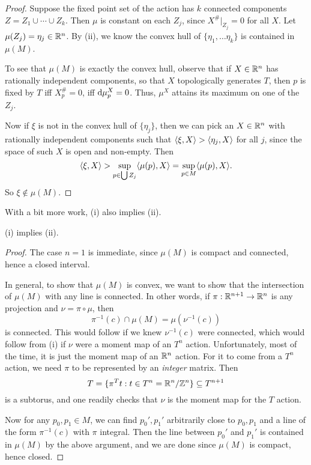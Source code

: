 \documentclass[a4paper]{article}
\begin{document}
\begin{proof}
  Suppose the fixed point set of the action has $k$ connected components $Z = Z_1 \cup \cdots \cup Z_k$. Then $\mu$ is constant on each $Z_j$, since $X^\#|_{Z_j} = 0$ for all $X$. Let $\mu(Z_j) = \eta_j \in \mathbb{R}^n$. By (ii), we know the convex hull of $\{\eta_1, \ldots \eta_k\}$ is contained in $\mu(M)$.

  To see that $\mu(M)$ is exactly the convex hull, observe that if $X \in \mathbb{R}^n$ has rationally independent components, so that $X$ topologically generates $T$, then $p$ is fixed by $T$ iff $X_p^\# = 0$, iff $\mathrm{d} \mu_p^X = 0$. Thus, $\mu^X$ attains its maximum on one of the $Z_j$.

  Now if $\xi$ is not in the convex hull of $\{\eta_j\}$, then we can pick an $X \in \mathbb{R}^n$ with rationally independent components such that $\langle \xi, X\rangle > \langle \eta_j, X\rangle$ for all $j$, since the space of such $X$ is open and non-empty. Then
  \[
    \langle \xi, X\rangle > \sup_{p \in \bigcup Z_j} \langle \mu(p), X\rangle = \sup_{p \in M} \langle \mu(p), X\rangle.
  \]
  So $\xi \not \in \mu(M)$.
\end{proof}

With a bit more work, (i) also implies (ii).
\begin{lemma}
  (i) implies (ii).
\end{lemma}
\begin{proof}
  The case $n = 1$ is immediate, since $\mu(M)$ is compact and connected, hence a closed interval.

  In general, to show that $\mu(M)$ is convex, we want to show that the intersection of $\mu(M)$ with any line is connected. In other words, if $\pi: \mathbb{R}^{n + 1} \to \mathbb{R}^n$ is any projection and $\nu = \pi \circ \mu$, then
  \[
    \pi^{-1}(c) \cap \mu(M) = \mu(\nu^{-1}(c))
  \]
  is connected. This would follow if we knew $\nu^{-1}(c)$ were connected, which would follow from (i) if $\nu$ were a moment map of an $T^n$ action. Unfortunately, most of the time, it is just the moment map of an $\mathbb{R}^n$ action. For it to come from a $T^n$ action, we need $\pi$ to be represented by an \emph{integer} matrix. Then
  \[
    T = \{\pi^T t : t \in T^n = \mathbb{R}^n /\mathbb{Z}^n\} \subseteq T^{n + 1}
  \]
  is a subtorus, and one readily checks that $\nu$ is the moment map for the $T$ action.

  Now for any $p_0, p_1 \in M$, we can find $p_0', p_1'$ arbitrarily close to $p_0, p_1$ and a line of the form $\pi^{-1}(c)$ with $\pi$ integral. Then the line between $p_0'$ and $p_1'$ is contained in $\mu(M)$ by the above argument, and we are done since $\mu(M)$ is compact, hence closed.
\end{proof}
\end{document}
